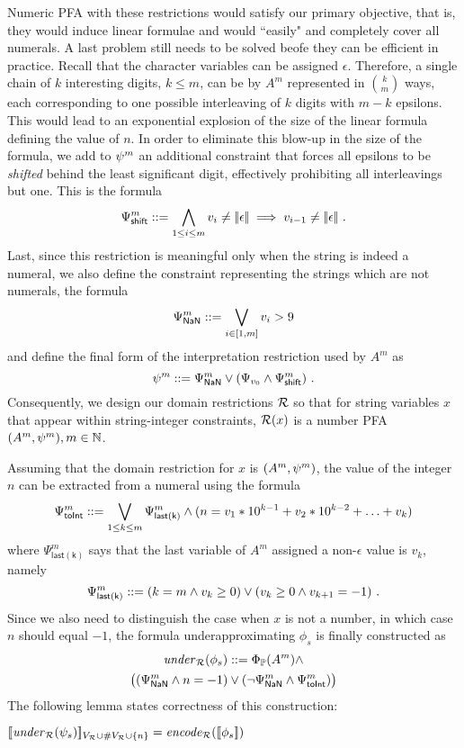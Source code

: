 \documentclass[sigplan,review,anonymous]{acmart}\settopmatter{printfolios=true,printccs=false,printacmref=false}
\begin{document}
Numeric PFA with these restrictions would satisfy our primary objective, that is, they would induce linear formulae and would ``easily" and completely cover all numerals.
%
A last problem still needs to be solved beofe they can be efficient in practice. 
%
Recall that the character variables can be assigned $\epsilon$.  
%
Therefore, a single chain of $k$ interesting digits, $k\leq m$, can be by $A^m$ represented in $k\choose m$ ways, each corresponding to one possible interleaving of $k$ digits with $m-k$ epsilons. 
%
%
This would lead to an exponential explosion of the size of the linear formula defining the value of $n$.
%
In order to eliminate this blow-up in the size of the formula, we add to $\psi^m$ an additional constraint that forces all epsilons to be \emph{shifted} behind the least significant digit, effectively prohibiting all interleavings but one. This is the formula
$$
\Psi_{\mathsf{shift}}^m ::= \bigwedge_{1\leq i \leq m} v_i \neq |\!|\epsilon|\!| \implies v_{i-1}\neq |\!|\epsilon|\!| \ .
$$
Last, since this restriction is meaningful only when the string is indeed a numeral,  
we also define the constraint representing the strings which are not numerals, the formula
$$
\Psi_{\mathsf{NaN}}^m ::=  \bigvee_{i\in [1,m]} v_i>9
$$ 
and define the final form of the interpretation restriction used by $A^m$ as 
$$
\psi^m ::=  \Psi_{\mathsf{NaN}}^m \lor (\Psi_{v_0} \land \Psi_{\mathsf{shift}}^m)\ .
$$
Consequently, we design our domain restrictions $\mathcal{R}$ so that for string variables $x$ that appear within string-integer constraints,  $\mathcal{R}(x)$ is a number PFA $(A^m,\psi^m),m\in \mathbb{N}$. 

Assuming that the domain restriction for $x$ is $(A^m,\psi^m)$, 
the value of the integer $n$ can be extracted from a numeral using the formula
$$
\Psi_{\mathsf{toInt}}^m::= \bigvee_{1\leq k \leq m} \Psi_{\mathsf{last(k)}}^m \land (n = v_1* 10^{k-1} + v_2* 10^{k-2} + \ldots + v_{k})
$$
where $\Psi_{\mathsf{last(k)}}^m$ says that the last variable of $A^m$ assigned a non-$\epsilon$ value is $v_{k}$, namely 
$$
\Psi_{\mathsf{last(k)}}^m ::= (k = m \land v_k \geq 0) \lor (v_{k} \geq 0 \land v_{k+1} = -1)\ .
$$
Since we also need to distinguish the case when $x$ is not a number, in which case $n$ should equal $-1$, 
the formula underapproximating $\phi_s$ is finally constructed as  
\begin{multline*}
\mathit{under}_{\mathcal{R}}(\phi_s) 
::= 
\Phi_{\mathbb{P}}(A^m) 
\land \\
\bigl((\Psi_{\mathsf{NaN}}^m \land n = -1) 
\lor 
(\neg\Psi_{\mathsf{NaN}}^m \land \Psi_{\mathsf{toInt}}^m)\bigr)
\end{multline*}
The following lemma states correctness of this construction:
\begin{lemma}
$
[\![\mathit{under}_{\mathcal{R}}(\psi_s) ]\!]_{V_{\mathcal{R}} \cup \#V_{\mathcal{R}} \cup \{n\}} = \mathit{encode}_{\mathcal{R}}([\![\phi_s]\!])
$
\end{lemma}
\end{document}
